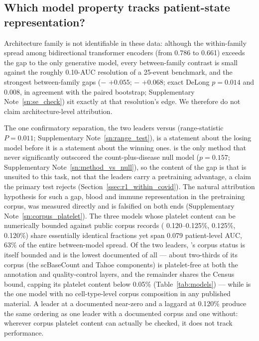 \subsection{Which model property tracks patient-state representation?}
\label{ssec:discussion_property}

Architecture family is not identifiable in these data: although the
within-family spread among bidirectional transformer encoders (from
 0.786 to  0.661) exceeds the gap to the only
generative model, every between-family contrast is small against the roughly
0.10-AUC resolution of a 25-event benchmark, and the strongest between-family
gaps ($-$ $+0.055$;
$-$ $+0.068$; exact DeLong $p = 0.014$ and
$0.008$, in agreement with the paired bootstrap;
Supplementary Note~\ref{sn:se_check}) sit exactly at that resolution's
edge. We therefore do not claim architecture-level attribution.

The one confirmatory separation, the two leaders versus 
(range-statistic $P = 0.011$; Supplementary Note~\ref{sn:range_test}), is a
statement about the losing model before it is a statement about the winning
ones.  is the only method that never significantly outscored the
count-plus-disease null model ($p = 0.157$;
Supplementary Note~\ref{sn:method_vs_null}), so the content of the gap is
that  is unsuited to this task, not that the leaders carry a
pretraining advantage, a claim the primary test rejects
(Section~\ref{ssec:r1_within_covid}). The natural attribution hypothesis for
such a gap, blood and immune representation in the pretraining corpus, was
measured directly and is falsified on both ends
(Supplementary Note~\ref{sn:corpus_platelet}). The three models whose
platelet content can be numerically bounded against public corpus records
( 0.120--0.125\%,  0.125\%, 
0.120\%) share essentially identical fractions yet span 0.079 patient-level
AUC, 63\% of the entire between-model spread. Of the two leaders,
's corpus status is itself bounded and is the lowest documented
of all --- about two-thirds of its corpus (the scBaseCount and Tahoe
components) is platelet-free at both the annotation and quality-control
layers, and the remainder shares the Census bound, capping its platelet
content below 0.05\% (Table~\ref{tab:models}) --- while 
is the one model with no cell-type-level corpus composition in any published
material. A leader at a documented near-zero and a laggard at 0.120\%
produce the same ordering as one leader with a documented corpus and one
without: wherever corpus platelet content can actually be checked, it does
not track performance.

